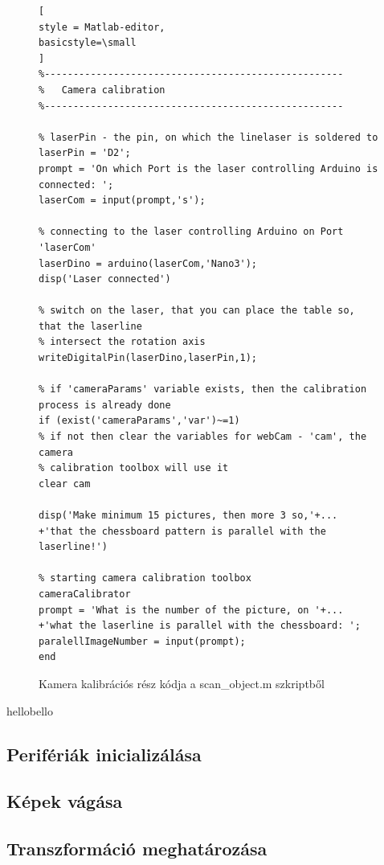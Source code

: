\documentclass[12pt,a4paper]{article}
\begin{document}
\begin{figure}[h!]
\centering
\begin{lstlisting}[
style = Matlab-editor,
basicstyle=\small
]
%----------------------------------------------------
%   Camera calibration
%----------------------------------------------------

% laserPin - the pin, on which the linelaser is soldered to
laserPin = 'D2';
prompt = 'On which Port is the laser controlling Arduino is connected: ';
laserCom = input(prompt,'s');

% connecting to the laser controlling Arduino on Port 'laserCom'
laserDino = arduino(laserCom,'Nano3');
disp('Laser connected')

% switch on the laser, that you can place the table so, that the laserline
% intersect the rotation axis
writeDigitalPin(laserDino,laserPin,1);

% if 'cameraParams' variable exists, then the calibration process is already done 
if (exist('cameraParams','var')~=1)
% if not then clear the variables for webCam - 'cam', the camera
% calibration toolbox will use it
clear cam

disp('Make minimum 15 pictures, then more 3 so,'+... 
+'that the chessboard pattern is parallel with the laserline!')

% starting camera calibration toolbox
cameraCalibrator
prompt = 'What is the number of the picture, on '+...
+'what the laserline is parallel with the chessboard: ';
paralellImageNumber = input(prompt);
end
\end{lstlisting}
\caption{Kamera kalibrációs rész kódja a scan\_object.m szkriptből}
\end{figure}

		
hellobello

\begin{figure}
	
\end{figure}


\subsection{Perifériák inicializálása}
\subsection{Képek vágása}
\subsection{Transzformáció meghatározása}
\end{document}
